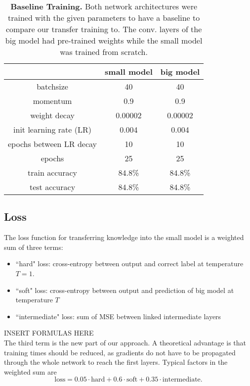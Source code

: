 \documentclass[10pt,twocolumn,letterpaper]{article}
\begin{document}
\begin{table}[]
	\begin{center}
	\begin{tabular}{|c|c|c|}
		\hline
								&	small model 	&	big model	\\ \hline
		batchsize					&	40			&	40		\\ \hline
		momentum				&	0.9			&	0.9		\\ \hline
		weight decay				&	0.00002		&	0.00002	\\ \hline
		init learning rate (LR)			&	0.004		&	0.004	\\ \hline
		epochs between LR decay 	&	10			&	10		\\ \hline
		epochs					&	25			&	25		\\ \hline
		train accuracy				&	84.8\%		&	84.8\%	\\ \hline
		test accuracy				&	84.8\%		&	84.8\%	\\ \hline
	\end{tabular}
	\end{center}
	\caption{\textbf{Baseline Training.} Both network architectures were trained with the given parameters to have a baseline to compare our transfer 	training to. The conv. layers of the big model had pre-trained weights while the small model was trained from scratch.}
	\label{tab:baseline_small_big}
\end{table}

\subsection{Loss}
The loss function for transferring knowledge into the small model is a weighted sum of three terms:
\begin{itemize}
	\item ``hard" loss: cross-entropy between output and correct label at temperature $T=1$.
	\item ``soft" loss: cross-entropy between output and prediction of big model at temperature $T$
	\item ``intermediate" loss: sum of MSE between linked intermediate layers
\end{itemize}
INSERT FORMULAS HERE \\
The third term is the new part of our approach. A theoretical advantage is that training times should be reduced, as gradients do not have to be propagated through the whole network to reach the first layers. Typical factors in the weighted sum are
\begin{equation}
	\text{loss} = 0.05 \cdot \text{hard} + 0.6 \cdot \text{soft} + 0.35 \cdot \text{intermediate}.
\end{equation}
\end{document}
